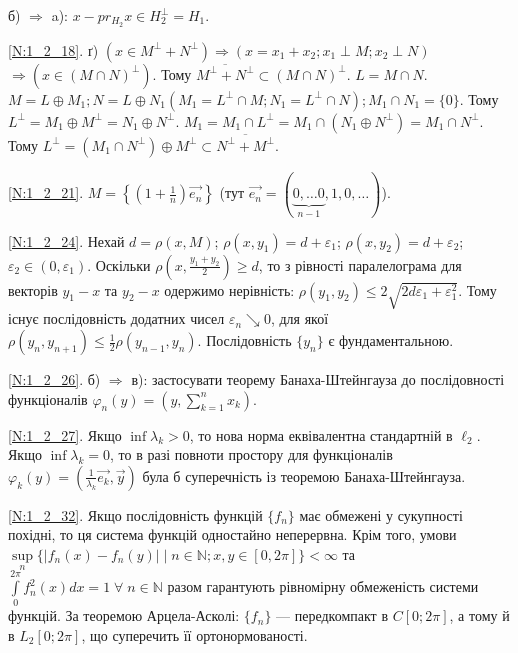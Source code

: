 \noindent б) $\Rightarrow$ a): $x - pr_{H_2} x \in H_2^{\perp} = H_1$.

\noindent\ref{N:1_2_18}. ґ) $(x \in M^{\perp}+N^{\perp}) \Rightarrow (x = x_1+x_2; x_1 \perp M; x_2 \perp N)$
$\Rightarrow (x \in (M \cap N)^{\perp})$. Тому $\overline{M^{\perp} + N^{\perp}} \subset (M \cap N)^{\perp}$.
$L = M \cap N$. $M = L \oplus  M_1; N = L \oplus N_1 (M_1 = L^{\perp} \cap M; N_1 = L^{\perp} \cap N); M_1 \cap N_1 = \{0\}$.
Тому $L^{\perp} = M_1 \oplus M^{\perp} = N_1 \oplus N^{\perp}$. 
$M_1 = M_1 \cap L^{\perp} = M_1 \cap (N_1 \oplus N^{\perp}) = M_1 \cap N^{\perp}$. 
Тому $L^{\perp} = (M_1 \cap N^{\perp}) \oplus M^{\perp} \subset \overline{N^{\perp} + M^{\perp}}$.

\noindent\ref{N:1_2_21}. $M = \left\{(1+\frac{1}{n})\vec{e_n}\right\}$ 
(тут $\vec{e_n} = (\underbrace{0, \dots 0}_{n-1}, 1, 0, \dots)$).

\noindent\ref{N:1_2_24}. Нехай $d = \rho(x, M)$; $\rho(x, y_1) = d + \varepsilon_1$; $\rho(x, y_2) = d + \varepsilon_2$;
$\varepsilon_2 \in (0, \varepsilon_1)$. Оскільки $\rho(x, \frac{y_1+y_2}{2}) \geq d$, то з
рівності паралелограма для векторів $y_1 - x$ та $y_2 - x$ одержимо нерівність: 
$\rho(y_1, y_2) \leq 2 \sqrt{2d\varepsilon_1 + \varepsilon_1^2}$. Тому існує послідовність додатних чисел
$\varepsilon_n \searrow 0$, для якої $\rho(y_n, y_{n+1}) \leq \frac{1}{2} \rho(y_{n-1}, y_n)$.
Послідовність $\{y_n\}$ є фундаментальною.

\noindent\ref{N:1_2_26}. б) $\Rightarrow$ в): застосувати теорему Банаха-Штейнгауза до послідовності функціоналів
$\varphi_n (y) = \left(y, \sum\limits_{k = 1}^n x_k\right)$.

\noindent\ref{N:1_2_27}. Якщо $\inf \lambda_k > 0$, то нова норма еквівалентна стандартній в $\ell_2$.
Якщо $\inf \lambda_k = 0$, то в разі повноти простору для функціоналів 
$\varphi_k (y) = (\frac{1}{\lambda_k} \vec{e_k}, \vec{y})$ була б суперечність із теоремою Банаха-Штейнгауза.

\noindent\ref{N:1_2_32}. Якщо послідовність функцій $\{f_n\}$ має обмежені у сукупності похідні, то ця
система функцій одностайно неперервна. Крім того, умови 
$\underset{n}{\sup} \{|f_n (x) - f_n (y)|\mid n \in \mathbb{N}; x, y \in [0, 2\pi]\} < \infty$ та 
$\int\limits_0^{2\pi} f_n^2 (x) dx = 1 \; \forall \;n \in \mathbb{N}$ разом гарантують рівномірну обмеженість системи функцій.
За теоремою Арцела-Асколі: $\{f_n\}$ --- передкомпакт в $C[0; 2\pi]$, а тому й в $L_2 [0; 2\pi]$, що
суперечить її ортонормованості.

